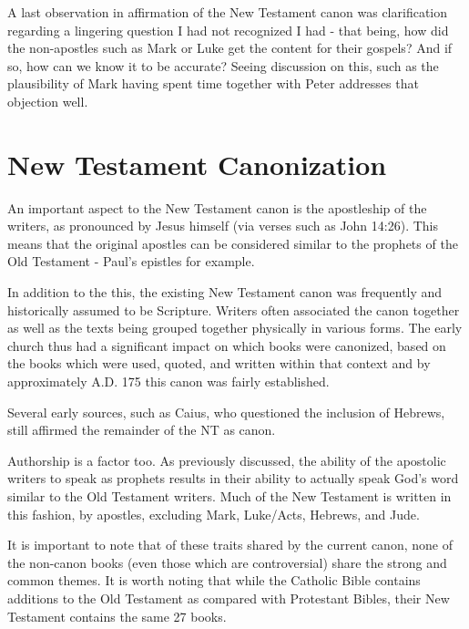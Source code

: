 \documentclass[12pt]{turabian-researchpaper}
\begin{document}
A last observation in affirmation of the New Testament canon was clarification regarding a lingering question I had not recognized I had - that being, how did the non-apostles such as Mark or Luke get the content for their gospels? And if so, how can we know it to be accurate? Seeing discussion on this, such as the plausibility of Mark having spent time together with Peter addresses that objection well.

\section{New Testament Canonization}

An important aspect to the New Testament canon is the apostleship of the writers, as pronounced by Jesus himself (via verses such as John 14:26). This means that the original apostles can be considered similar to the prophets of the Old Testament - Paul's epistles for example.

In addition to the this, the existing New Testament canon was frequently and historically assumed to be Scripture. Writers often associated the canon together as well as the texts being grouped together physically in various forms. The early church thus had a significant impact on which books were canonized, based on the books which were used, quoted, and written within that context and by approximately A.D. 175 this canon was fairly established. 


Several early sources, such as Caius, who questioned the inclusion of Hebrews, still affirmed the remainder of the NT as canon.


Authorship is a factor too. As previously discussed, the ability of the apostolic writers to speak as prophets results in their ability to actually speak God's word similar to the Old Testament writers. Much of the New Testament is written in this fashion, by apostles, excluding Mark, Luke/Acts, Hebrews, and Jude. 

It is important to note that of these traits shared by the current canon, none of the non-canon books (even those which are controversial) share the strong and common themes. It is worth noting that while the Catholic Bible contains additions to the Old Testament as compared with Protestant Bibles, their New Testament contains the same 27 books.

\newpage
\printbibliography
\end{document}
